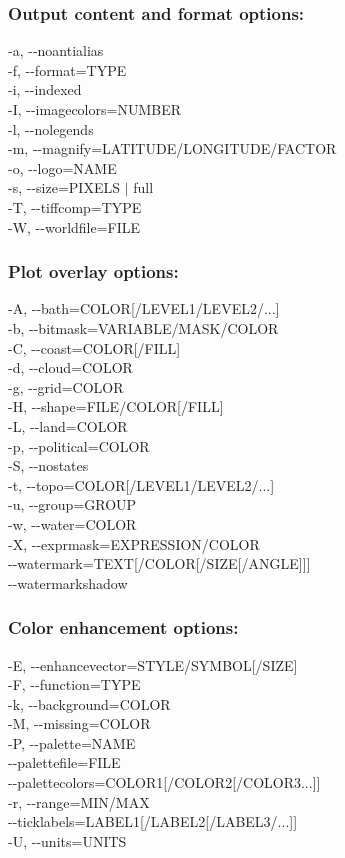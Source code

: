 \subsubsection*{Output content and format options:}


  -a, -{-}noantialias \\ 
 -f, -{-}format=TYPE \\ 
 -i, -{-}indexed \\ 
 -I, -{-}imagecolors=NUMBER \\ 
 -l, -{-}nolegends \\ 
 -m, -{-}magnify=LATITUDE/LONGITUDE/FACTOR \\ 
 -o, -{-}logo=NAME \\ 
 -s, -{-}size=PIXELS $|$ full \\ 
 -T, -{-}tiffcomp=TYPE \\ 
 -W, -{-}worldfile=FILE 
\subsubsection*{Plot overlay options:}


  -A, -{-}bath=COLOR[/LEVEL1/LEVEL2/...] \\ 
 -b, -{-}bitmask=VARIABLE/MASK/COLOR \\ 
 -C, -{-}coast=COLOR[/FILL] \\ 
 -d, -{-}cloud=COLOR \\ 
 -g, -{-}grid=COLOR \\ 
 -H, -{-}shape=FILE/COLOR[/FILL] \\ 
 -L, -{-}land=COLOR \\ 
 -p, -{-}political=COLOR \\ 
 -S, -{-}nostates \\ 
 -t, -{-}topo=COLOR[/LEVEL1/LEVEL2/...] \\ 
 -u, -{-}group=GROUP \\ 
 -w, -{-}water=COLOR \\ 
 -X, -{-}exprmask=EXPRESSION/COLOR \\ 
 -{-}watermark=TEXT[/COLOR[/SIZE[/ANGLE{]}]] \\ 
 -{-}watermarkshadow 
\subsubsection*{Color enhancement options:}


  -E, -{-}enhancevector=STYLE/SYMBOL[/SIZE] \\ 
 -F, -{-}function=TYPE \\ 
 -k, -{-}background=COLOR \\ 
 -M, -{-}missing=COLOR \\ 
 -P, -{-}palette=NAME \\ 
 -{-}palettefile=FILE \\ 
 -{-}palettecolors=COLOR1[/COLOR2[/COLOR3...{]}] \\ 
 -r, -{-}range=MIN/MAX \\ 
 -{-}ticklabels=LABEL1[/LABEL2[/LABEL3/...{]}] \\ 
 -U, -{-}units=UNITS 
